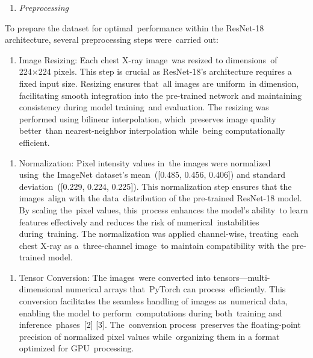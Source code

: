 \documentclass[
  twocolumn,
  10pt,
  a4paper,
  journal
]{IEEEtran}
\begin{document}
\begin{enumerate}
\def\labelenumi{\Alph{enumi}.}
\setcounter{enumi}{3}
\item
  \emph{Preprocessing}
\end{enumerate}

To prepare the dataset for optimal~performance within the ResNet-18 architecture, several preprocessing steps were~carried out:

\begin{enumerate}
\def\labelenumi{\arabic{enumi}.}
\item
  Image Resizing: Each chest X-ray image~was resized to dimensions~of 224×224 pixels. This step is crucial as ResNet-18's architecture requires a fixed input size. Resizing ensures that~all images are uniform~in dimension, facilitating smooth integration into the pre-trained network and maintaining consistency during model training~and evaluation. The resizing was performed using bilinear interpolation, which~preserves image quality better~than nearest-neighbor interpolation while~being computationally efficient.
\end{enumerate}

\begin{enumerate}
\def\labelenumi{\arabic{enumi}.}
\setcounter{enumi}{1}
\item
  Normalization: Pixel intensity values in~the images were normalized
  using~the ImageNet dataset's mean~({[}0.485, 0.456, 0.406{]}) and standard deviation~({[}0.229, 0.224, 0.225{]}). This
  normalization step ensures that the images~align with the
  data~distribution of the pre-trained ResNet-18 model. By scaling
  the~pixel values, this~process enhances the model's ability~to learn features effectively and reduces the risk of
  numerical~instabilities during~training. The normalization was applied
  channel-wise, treating~each chest X-ray as a~three-channel image~to
  maintain compatibility with the pre-trained model.
\end{enumerate}

\begin{enumerate}
\def\labelenumi{\arabic{enumi}.}
\setcounter{enumi}{2}
\item
  Tensor Conversion: The images~were converted into
  tensors---multi-dimensional numerical arrays that~PyTorch can
  process~efficiently. This conversion facilitates the seamless handling
  of images as~numerical data, enabling the model to
  perform~computations during both~training and inference~phases~{[}2{]}
  {[}3{]}. The~conversion process~preserves the floating-point precision
  of normalized pixel values while~organizing them in a format optimized
  for GPU~processing.
\end{enumerate}
\end{document}
